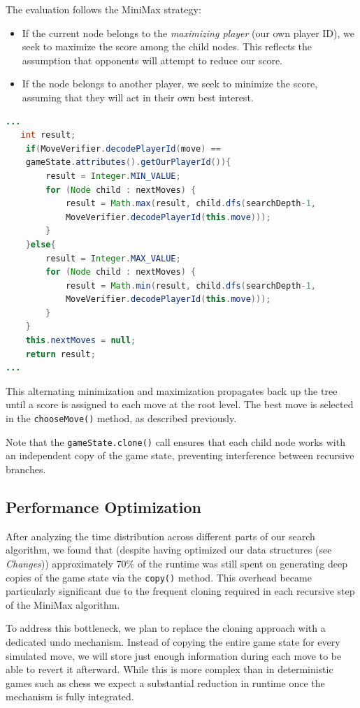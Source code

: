 \noindent The evaluation follows the MiniMax strategy:
\begin{itemize}
    \item If the current node belongs to the \textit{maximizing player} (our own player ID), we seek to maximize the score among the child nodes. This reflects the assumption that opponents will attempt to reduce our score.
    \item If the node belongs to another player, we seek to minimize the score, assuming that they will act in their own best interest.
\end{itemize}

\begin{lstlisting}[language=Java,basicstyle=\ttfamily\small]
...
   int result;
    if(MoveVerifier.decodePlayerId(move) == 
    gameState.attributes().getOurPlayerId()){
        result = Integer.MIN_VALUE;
        for (Node child : nextMoves) {
            result = Math.max(result, child.dfs(searchDepth-1, 
            MoveVerifier.decodePlayerId(this.move)));
        }
    }else{
        result = Integer.MAX_VALUE;
        for (Node child : nextMoves) {
            result = Math.min(result, child.dfs(searchDepth-1, 
            MoveVerifier.decodePlayerId(this.move)));
        }
    }
    this.nextMoves = null;
    return result;     
...
\end{lstlisting}

\noindent This alternating minimization and maximization propagates back up the tree until a score is assigned to each move at the root level. The best move is selected in the \texttt{chooseMove()} method, as described previously.

\medskip

\noindent Note that the \texttt{gameState.clone()} call ensures that each child node works with an independent copy of the game state, preventing interference between recursive branches.

\subsection*{Performance Optimization}

\noindent After analyzing the time distribution across different parts of our search algorithm, we found that (despite having optimized our data structures (see \textit{Changes})) approximately 70\% of the runtime was still spent on generating deep copies of the game state via the \texttt{copy()} method. This overhead became particularly significant due to the frequent cloning required in each recursive step of the MiniMax algorithm.

\medskip

\noindent To address this bottleneck, we plan to replace the cloning approach with a dedicated undo mechanism. Instead of copying the entire game state for every simulated move, we will store just enough information during each move to be able to revert it afterward. While this is more complex than in deterministic games such as chess we expect a substantial reduction in runtime once the mechanism is fully integrated.

